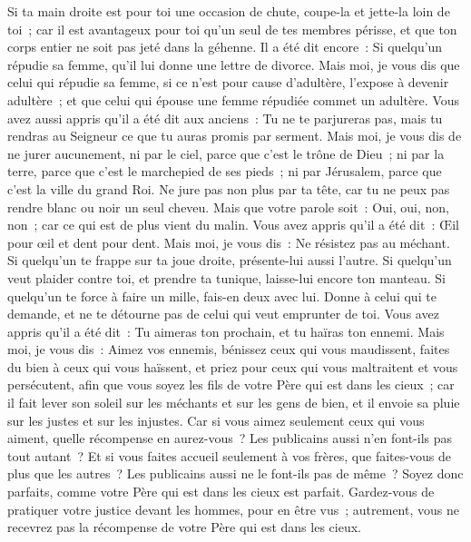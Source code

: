 \begin{multicols}{2}
Si ta main droite est pour toi une occasion de chute, coupe-la et jette-la loin de toi~; car il est avantageux pour toi qu'un seul de tes membres périsse, et que ton corps entier ne soit pas jeté dans la géhenne.
Il a été dit encore~: Si quelqu'un répudie sa femme, qu'il lui donne une lettre de divorce.
Mais moi, je vous dis que celui qui répudie sa femme, si ce n'est pour cause d'adultère, l'expose à devenir adultère~; et que celui qui épouse une femme répudiée commet un adultère.
Vous avez aussi appris qu'il a été dit aux anciens~: Tu ne te parjureras pas, mais tu rendras au Seigneur ce que tu auras promis par serment.
Mais moi, je vous dis de ne jurer aucunement, ni par le ciel, parce que c'est le trône de Dieu~;
ni par la terre, parce que c'est le marchepied de ses pieds~; ni par Jérusalem, parce que c'est la ville du grand Roi.
Ne jure pas non plus par ta tête, car tu ne peux pas rendre blanc ou noir un seul cheveu.
Mais que votre parole soit~: Oui, oui, non, non~; car ce qui est de plus vient du malin.
Vous avez appris qu'il a été dit~: Œil pour œil et dent pour dent.
Mais moi, je vous dis~: Ne résistez pas au méchant. Si quelqu'un te frappe sur ta joue droite, présente-lui aussi l'autre.
Si quelqu'un veut plaider contre toi, et prendre ta tunique, laisse-lui encore ton manteau.
Si quelqu'un te force à faire un mille, fais-en deux avec lui.
Donne à celui qui te demande, et ne te détourne pas de celui qui veut emprunter de toi.
Vous avez appris qu'il a été dit~: Tu aimeras ton prochain, et tu haïras ton ennemi.
Mais moi, je vous dis~: Aimez vos ennemis, bénissez ceux qui vous maudissent, faites du bien à ceux qui vous haïssent, et priez pour ceux qui vous maltraitent et vous persécutent,
afin que vous soyez les fils de votre Père qui est dans les cieux~; car il fait lever son soleil sur les méchants et sur les gens de bien, et il envoie sa pluie sur les justes et sur les injustes.
Car si vous aimez seulement ceux qui vous aiment, quelle récompense en aurez-vous~? Les publicains aussi n'en font-ils pas tout autant~?
Et si vous faites accueil seulement à vos frères, que faites-vous de plus que les autres~? Les publicains aussi ne le font-ils pas de même~?
Soyez donc parfaits, comme votre Père qui est dans les cieux est parfait.
\VerseOne{}Gardez-vous de pratiquer votre justice devant les hommes, pour en être vus~; autrement, vous ne recevrez pas la récompense de votre Père qui est dans les cieux.

\end{multicols}
